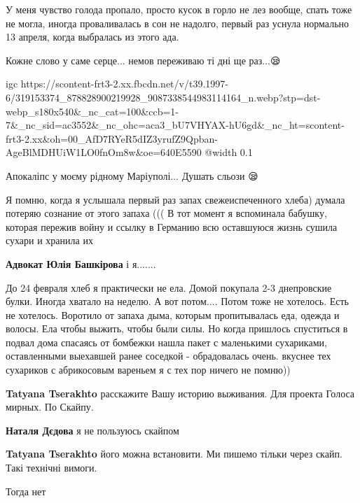 
У меня чувство голода пропало, просто кусок в горло не лез вообще, спать тоже не
могла, иногда проваливалась в сон не надолго, первый раз уснула нормально 13
апреля, когда выбралась из этого ада.

Кожне слово у саме серце... немов переживаю ті дні ще раз...😪


\ifcmt
  igc https://scontent-frt3-2.xx.fbcdn.net/v/t39.1997-6/319153374_878828900219928_9087338544983114164_n.webp?stp=dst-webp_s180x540&_nc_cat=100&ccb=1-7&_nc_sid=ac3552&_nc_ohc=aca3_bU7VHYAX-hU6gd&_nc_ht=scontent-frt3-2.xx&oh=00_AfD7RYeR5dIZ3yrufZ9Qpban-AgeBlMDHUiW1LO0fnOm8w&oe=640E5590
	@width 0.1
\fi


Апокаліпс у моєму рідному Маріуполі... Душать сльози 😪


Я помню, когда я услышала первый раз запах свежеиспеченного хлеба) думала
потеряю сознание от этого запаха ((( В тот момент я вспоминала бабушку, которая
пережив войну и ссылку в Германию всю оставшуюся жизнь сушила сухари и хранила
их

\begin{itemize} %
\textbf{Адвокат Юлія Башкірова} і я.......
\end{itemize} %


До 24 февраля хлеб я практически не ела. Домой покупала 2-3 днепровские булки.
Иногда хватало на неделю. А вот потом.... Потом тоже не хотелось. Есть не
хотелось. Воротило от запаха дыма, которым пропитывалась еда, одежда и волосы.
Ела чтобы выжить, чтобы были силы. Но когда пришлось спуститься в подвал дома
спасаясь от бомбежки нашла пакет с маленькими сухариками, оставленными
выехавшей ранее соседкой - обрадовалась очень. вкуснее тех сухариков с
абрикосовым вареньем я с тех пор ничего не помню))

\begin{itemize} %
\textbf{Tatyana Tserakhto} расскажите Вашу историю выживания. Для проекта Голоса мирных. По Скайпу.

\textbf{Наталя Дєдова} я не пользуюсь скайпом

\textbf{Tatyana Tserakhto} його можна встановити. Ми пишемо тільки через скайп. Такі технічні вимоги.

Тогда нет

\end{itemize} %

